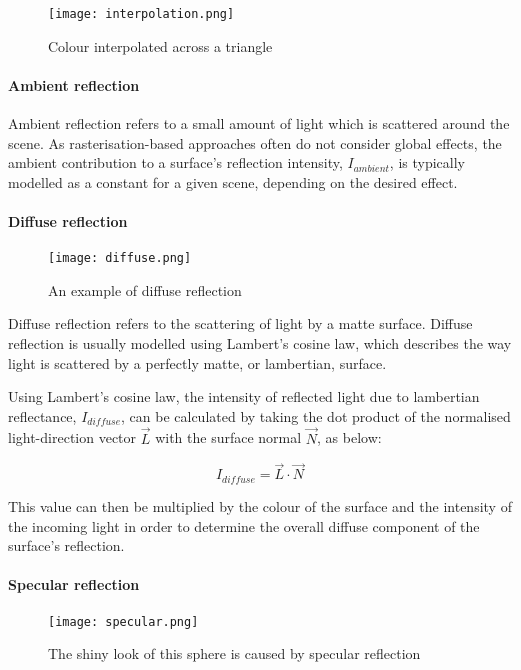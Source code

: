 \begin{figure}
\centering
	\texttt{[image: interpolation.png]}
	\caption{Colour interpolated across a triangle}
	\label{fig:colour-interpolation}
\end{figure}


\paragraph{Ambient reflection}
Ambient reflection refers to a small amount of light which is scattered around the scene. As rasterisation-based approaches often do not consider global effects, the ambient contribution to a surface's reflection intensity, $I_{ambient}$, is typically modelled as a constant for a given scene, depending on the desired effect.

\paragraph{Diffuse reflection}

\begin{figure}
\centering
	\texttt{[image: diffuse.png]}
	\caption{An example of diffuse reflection}
	\label{fig:diffuse-reflection}
\end{figure}

Diffuse reflection refers to the scattering of light by a matte surface. Diffuse reflection is usually modelled using Lambert's cosine law, which describes the way light is scattered by a perfectly matte, or lambertian, surface.

Using Lambert's cosine law, the intensity of reflected light due to lambertian reflectance, $I_{diffuse}$, can be calculated by taking the dot product of the normalised light-direction vector $\vec{L}$ with the surface normal $\vec{N}$, as below:

\[
	I_{diffuse} = \vec{L} \cdot \vec{N}
\]

This value can then be multiplied by the colour of the surface and the intensity of the incoming light in order to determine the overall diffuse component of the surface's reflection.

\paragraph{Specular reflection}

\begin{figure}
\centering
	\texttt{[image: specular.png]}
	\caption{The shiny look of this sphere is caused by specular reflection}
	\label{fig:specular-reflection}
\end{figure}

